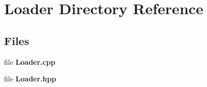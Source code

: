 \section{Loader Directory Reference}
\label{dir_fd50d1bf4544eeddbf688b84437a3906}
\subsection*{Files}
\begin{DoxyCompactItemize}
\item 
file \textbf{ Loader.\+cpp}
\item 
file \textbf{ Loader.\+hpp}
\end{DoxyCompactItemize}
